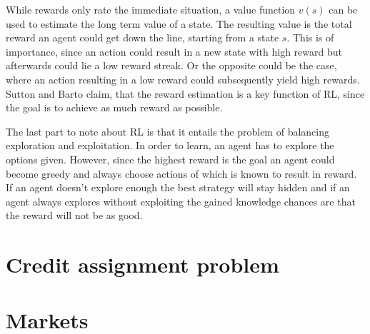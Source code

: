 While rewards only rate the immediate situation, a value function $v(s)$ can be
used to estimate the long term value of a state. The resulting value is the total reward
an agent could get down the line,
starting from a state $s$. This is of importance, since an action
could result in a new state with high reward but afterwards could lie a low reward
streak. Or the opposite could be the case, where an action resulting in a low reward
could subsequently yield high rewards. Sutton and Barto claim, that the reward estimation
is a key function of RL, since the goal is to achieve as much reward as possible.

The last part to note about RL is that it entails the problem of balancing
exploration and exploitation. In order to learn, an agent has to explore the options
given. However, since the highest reward is the goal an agent could become greedy
and always choose actions of which is known to result in reward. If an agent doesn't
explore enough the best strategy will stay hidden and if an agent always explores
without exploiting the gained knowledge chances are that the reward will not be as good.

\section{Credit assignment problem}

\section{Markets}

